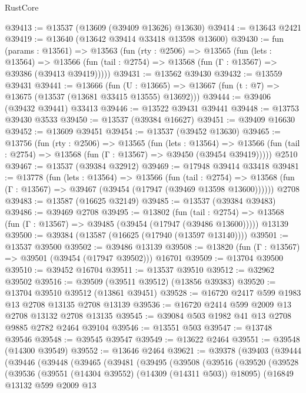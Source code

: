 \begin{lexlean}{RustCore}
\begin{coremodule}
@39413 := @13537 (@13609 (@39409 @13626) @13630)
@39414 := @13643 @2421
@39419 := @13640 (@13642 @39414 @33418 @13598 @13600)
@39430 := fun (params : @13561) =>
  @13563
    (fun (rty : @2506) =>
    @13565
      (fun (lets : @13564) =>
      @13566 (fun (tail : @2754) => @13568 (fun (Γ : @13567) => @39386 (@39413 @39419)))))
@39431 := @13562 @39430
@39432 := @13559 @39431
@39441 := @13666
    (fun (U : @13665) => @13667 (fun (t : @7) => @13675 (@13537 (@13681 @33415 @13555) @13692)))
@39444 := @39406 (@39432 @39441) @33413
@39446 := @13522 @39431 @39441
@39448 := @13753 @39430 @3533
@39450 := @13537 (@39384 @16627)
@39451 := @39409 @16630
@39452 := @13609 @39451
@39454 := @13537 (@39452 @13630)
@39465 := @13756
    (fun (rty : @2506) =>
    @13565
      (fun (lets : @13564) =>
      @13566 (fun (tail : @2754) => @13568 (fun (Γ : @13567) => @39450 (@39454 @39419)))))
    @2510
@39467 := @13537 (@39384 @32912)
@39469 := @17948 @39414 @33418
@39481 := @13778
    (fun (lets : @13564) =>
    @13566
      (fun (tail : @2754) =>
      @13568 (fun (Γ : @13567) => @39467 (@39454 (@17947 (@39469 @13598 @13600))))))
    @2708
@39483 := @13587 (@16625 @32149)
@39485 := @13537 (@39384 @39483)
@39486 := @39469 @2708
@39495 := @13802
    (fun (tail : @2754) => @13568 (fun (Γ : @13567) => @39485 (@39454 (@17947 (@39486 @13600)))))
    @13139
@39500 := @39384 (@13587 (@16625 (@17940 (@13597 @13140))))
@39501 := @13537 @39500
@39502 := @39486 @13139
@39508 := @13820 (fun (Γ : @13567) => @39501 (@39454 (@17947 @39502))) @16701
@39509 := @13704 @39500
@39510 := @39452 @16704
@39511 := @13537 @39510
@39512 := @32962 @39502
@39516 := @39509 (@39511 @39512) (@13856 @39383)
@39520 := @13704 @39510 @39512 (@13861 @39451)
@39528 := @16720 @2417 @599 @1983 @13 @2708 @13135 @2708 @13139
@39536 := @16720 @2414 @599 @2009 @13 @2708 @13132 @2708 @13135
@39545 := @39084 @503 @1982 @41 @13 @2708 @9885 @2782 @2464 @39104
@39546 := @13551 @503
@39547 := @13748 @39546
@39548 := @39545 @39547
@39549 := @13622 @2464
@39551 := @39548 (@14300 @39549)
@39552 := @13646 @2464
@39621 := @39378
    (@39403
      (@39444
        (@39446
          (@39448
            (@39465
              (@39481
                (@39495
                  (@39508
                    (@39516
                      (@39520
                        (@39528
                          (@39536
                            (@39551 (@14304 @39552) (@14309 (@14311 @503)) @18095)
                            (@16849
                              @13132
                              @599
                              @2009
                              @13

\end{coremodule}
\end{lexlean}
